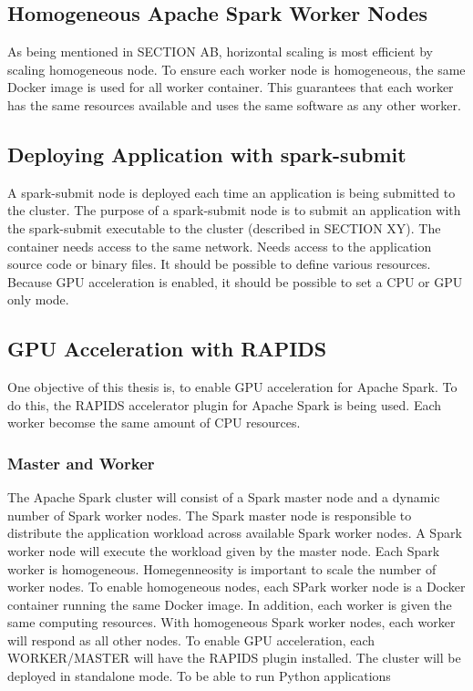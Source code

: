 \subsection{Homogeneous Apache Spark Worker Nodes}
As being mentioned in SECTION AB, horizontal scaling is most efficient by scaling homogeneous node.
To ensure each worker node is homogeneous, the same Docker image is used for all worker container.
This guarantees that each worker has the same resources available and uses the same software as any other worker.


\subsection{Deploying Application with spark-submit}
A spark-submit node is deployed each time an application is being submitted to the cluster.
The purpose of a spark-submit node is to submit an application with the spark-submit executable to the cluster (described in SECTION XY).
The container needs access to the same network. Needs access to the application source code or binary files.
It should be possible to define various resources.
Because GPU acceleration is enabled, it should be possible to set a CPU or GPU only mode.


\subsection{GPU Acceleration with RAPIDS}
One objective of this thesis is, to enable GPU acceleration for Apache Spark.
%
To do this, the RAPIDS accelerator plugin for Apache Spark is being used.
Each worker becomse the same amount of CPU resources.


\subsubsection{Master and Worker}
The Apache Spark cluster will consist of a Spark master node and a dynamic number of Spark worker nodes.
The Spark master node is responsible to distribute the application workload across available Spark worker nodes.
A Spark worker node will execute the workload given by the master node. Each Spark worker is homogeneous. 
Homegenneosity is important to scale the number of worker nodes. To enable homogeneous nodes, each SPark worker node is a Docker container running the same Docker image. In addition, each worker is given the same computing resources. With homogeneous Spark worker nodes, each worker will respond as all other nodes.
To enable GPU acceleration, each WORKER/MASTER will have the RAPIDS plugin installed.
The cluster will be deployed in standalone mode. To be able to run Python applications


